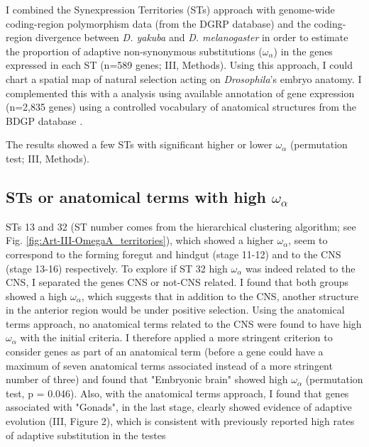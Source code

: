 
I combined the Synexpression Territories (STs) approach with genome-wide coding-region polymorphism data (from the DGRP database) and the coding-region divergence between \textit{D. yakuba} and \textit{D. melanogaster} in order to estimate the  proportion of adaptive non-synonymous substitutions ($\omega_{\alpha}$) in the genes expressed in each ST (n=589 genes; III, Methods).
Using this approach, I could chart a spatial map of natural selection acting on \textit{Drosophila}'s embryo anatomy.
I complemented this with a analysis using available annotation of gene expression (n=2,835 genes) using a controlled vocabulary of anatomical structures from the BDGP database \citep{Tomancak2007}.

The results showed a few STs with significant higher or lower $\omega_{\alpha}$ (permutation test; III, Methods).

\subsection{STs or anatomical terms with high {\large$\omega_{\alpha}$}}
STs 13 and 32 (ST number comes from the hierarchical clustering algorithm; see Fig. \ref{fig:Art-III-OmegaA_territories}), which showed a higher $\omega_{\alpha}$, seem to correspond to the forming foregut and hindgut (stage 11-12) and to the CNS (stage 13-16) respectively.
To explore if ST 32 high $\omega_{\alpha}$ was indeed related to the CNS, I separated the genes CNS or not-CNS related.
I found that both groups showed a high $\omega_{\alpha}$, which suggests that in addition to the CNS, another structure in the anterior region would be under positive selection.
Using the anatomical terms approach, no anatomical terms related to the CNS were found to have high $\omega_{\alpha}$ with the initial criteria.
I therefore applied a more stringent criterion to consider genes as part of an anatomical term (before a gene could have a maximum of seven anatomical terms associated instead of a more stringent number of three) and found that "Embryonic brain" showed high $\omega_{\alpha}$ (permutation test, p = 0.046).
Also, with the anatomical terms approach, I found that genes associated with "Gonads", in the last stage, clearly showed evidence of adaptive evolution (III, Figure 2), which is consistent with previously reported high rates of adaptive substitution in the testes \citep{Akashi1994,Civetta1995,Nuzhdin2004,Proschel2006}

